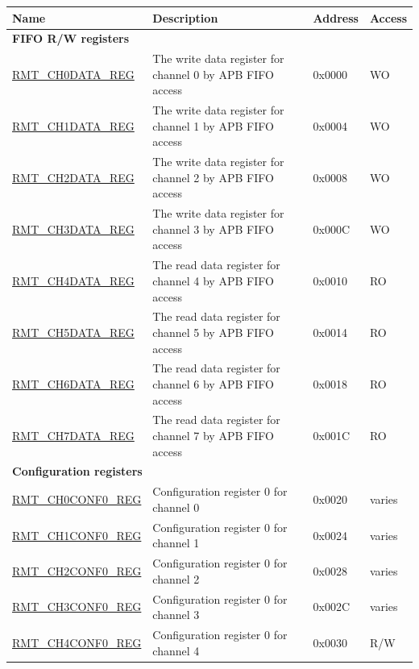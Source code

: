\begin{longtable}{ | p{5.5cm} | p{6.9cm} | p{1.3cm} | p{1.8cm} | }
\hline\rowcolor{lightgray}
\textbf{Name} & \textbf{Description} &  \textbf{Address} & \textbf{Access} \\ \hline
\endhead
\multicolumn{4}{|l|}{\textbf{FIFO R/W registers}} \\ \hline
\hyperref[regdesc:RMTCHNDATAREG]{RMT\_CH0DATA\_REG} & The write data register for channel 0 by APB FIFO access & 0x0000 & WO \\ \hline
\hyperref[regdesc:RMTCHNDATAREG]{RMT\_CH1DATA\_REG} & The write data register for channel 1 by APB FIFO access & 0x0004 & WO \\ \hline
\hyperref[regdesc:RMTCHNDATAREG]{RMT\_CH2DATA\_REG} & The write data register for channel 2 by APB FIFO access & 0x0008 & WO \\ \hline
\hyperref[regdesc:RMTCHNDATAREG]{RMT\_CH3DATA\_REG} & The write data register for channel 3 by APB FIFO access & 0x000C & WO \\ \hline
\hyperref[regdesc:RMTCHMDATAREG]{RMT\_CH4DATA\_REG} & The read data register for channel 4 by APB FIFO access & 0x0010 & RO \\ \hline
\hyperref[regdesc:RMTCHMDATAREG]{RMT\_CH5DATA\_REG} & The read data register for channel 5 by APB FIFO access & 0x0014 & RO \\ \hline
\hyperref[regdesc:RMTCHMDATAREG]{RMT\_CH6DATA\_REG} & The read data register for channel 6 by APB FIFO access & 0x0018 & RO \\ \hline
\hyperref[regdesc:RMTCHMDATAREG]{RMT\_CH7DATA\_REG} & The read data register for channel 7 by APB FIFO access & 0x001C & RO \\ \hline
\multicolumn{4}{|l|}{\textbf{Configuration registers}} \\ \hline
\hyperref[regdesc:RMTCHNCONF0REG]{RMT\_CH0CONF0\_REG} & Configuration register 0 for channel 0 & 0x0020 & varies \\ \hline
\hyperref[regdesc:RMTCHNCONF0REG]{RMT\_CH1CONF0\_REG} & Configuration register 0 for channel 1 & 0x0024 & varies \\ \hline
\hyperref[regdesc:RMTCHNCONF0REG]{RMT\_CH2CONF0\_REG} & Configuration register 0 for channel 2 & 0x0028 & varies \\ \hline
\hyperref[regdesc:RMTCHNCONF0REG]{RMT\_CH3CONF0\_REG} & Configuration register 0 for channel 3 & 0x002C & varies \\ \hline
\hyperref[regdesc:RMTCHMCONF0REG]{RMT\_CH4CONF0\_REG} & Configuration register 0 for channel 4 & 0x0030 & R/W \\ \hline

\end{longtable}
